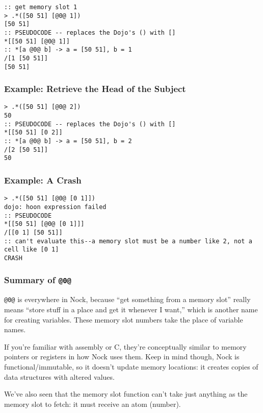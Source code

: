 \documentclass[twoside]{article}
\begin{document}
\begin{lstlisting}[style=listingcode]
:: get memory slot 1
> .*([50 51] [@0@ 1])
[50 51]
:: PSEUDOCODE -- replaces the Dojo's () with []
*[[50 51] [@0@ 1]]
:: *[a @0@ b] -> a = [50 51], b = 1
/[1 [50 51]]
[50 51]
\end{lstlisting}

\subsubsection{Example:  Retrieve the Head of the Subject}

\begin{lstlisting}[style=listingcode]
> .*([50 51] [@0@ 2])
50
:: PSEUDOCODE -- replaces the Dojo's () with []
*[[50 51] [0 2]]
:: *[a @0@ b] -> a = [50 51], b = 2
/[2 [50 51]]
50
\end{lstlisting}

\subsubsection{Example:  A Crash}

\begin{lstlisting}[style=listingcode]
> .*([50 51] [@0@ [0 1]])
dojo: hoon expression failed
:: PSEUDOCODE
*[[50 51] [@0@ [0 1]]]
/[[0 1] [50 51]]
:: can't evaluate this--a memory slot must be a number like 2, not a cell like [0 1]
CRASH
\end{lstlisting}

\subsubsection{Summary of \lstinline[style=inlinecode]{@0@}}

\lstinline[style=inlinecode]{@0@} is everywhere in Nock, because “get something from a memory slot” really means “store stuff in a place and get it whenever I want,” which is another name for creating variables. These memory slot numbers take the place of variable names.

If you're familiar with assembly or C, they're conceptually similar to memory pointers or registers in how Nock uses them. Keep in mind though, Nock is functional/immutable, so it doesn't update memory locations: it creates copies of data structures with altered values.

We've also seen that the memory slot function can't take just anything as the memory slot to fetch: it must receive an atom (number).
\end{document}
